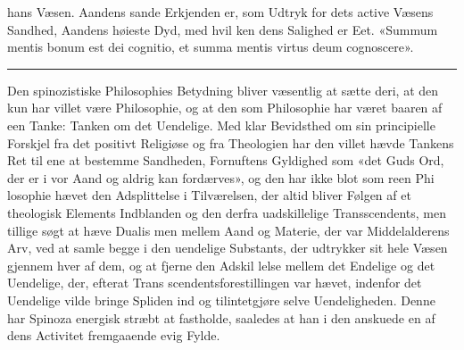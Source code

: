 \documentclass[12pt,a4paper]{book}
\newcommand{\divrule}{\begin{center}\rule{2cm}{0.4pt}\end{center}}
\begin{document}
hans Væsen. Aandens sande Erkjenden er, som Udtryk for
dets active Væsens Sandhed, Aandens høieste Dyd, med hvil\-%
ken dens Salighed er Eet. «Summum mentis bonum est dei
cognitio, et summa mentis virtus deum cognoscere».

\divrule

Den spinozistiske Philosophies Betydning bliver væsentlig
at sætte deri, at den kun har villet være Philosophie, og at
den som Philosophie har været baaren af een Tanke: Tanken
om det Uendelige. Med klar Bevidsthed om sin principielle
Forskjel fra det positivt Religiøse og fra Theologien har den
villet hævde Tankens Ret til ene at bestemme Sandheden,
Fornuftens Gyldighed som «det Guds Ord, der er i vor Aand
og aldrig kan fordærves», og den har ikke blot som reen Phi\-%
losophie hævet den Adsplittelse i Tilværelsen, der altid bliver
Følgen af et theologisk Elements Indblanden og den derfra
uadskillelige Transscendents, men tillige søgt at hæve Dualis\-%
men mellem Aand og Materie, der var Middelalderens Arv, ved
at samle begge i den uendelige Substants, der udtrykker sit
hele Væsen gjennem hver af dem, og at fjerne den Adskil\-%
lelse mellem det Endelige og det Uendelige, der, efterat Trans\-%
scendentsforestillingen var hævet, indenfor det Uendelige vilde
bringe Spliden ind og tilintetgjøre selve Uendeligheden. Denne
har Spinoza energisk stræbt at fastholde, saaledes at han i
den anskuede en af dens Activitet fremgaaende evig Fylde.
\end{document}
